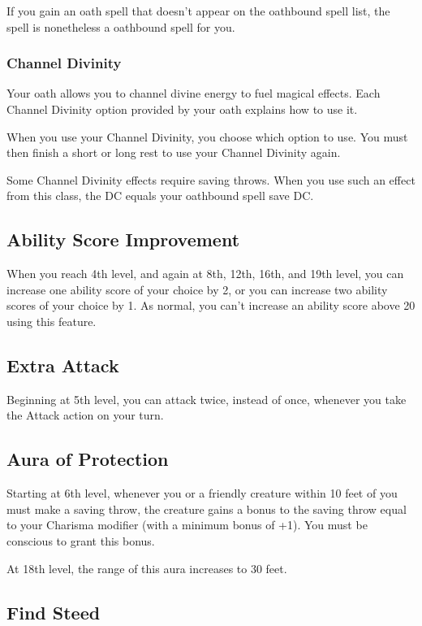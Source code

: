 If you gain an oath spell that doesn't appear on the oathbound spell list, the spell is nonetheless a oathbound spell for you.

\subsubsection{Channel Divinity}

Your oath allows you to channel divine energy to fuel magical effects. Each Channel Divinity option provided by your oath explains how to use it.

When you use your Channel Divinity, you choose which option to use. You must then finish a short or long rest to use your Channel Divinity again.

Some Channel Divinity effects require saving throws. When you use such an effect from this class, the DC equals your oathbound spell save DC.

\subsection{Ability Score Improvement}

When you reach 4th level, and again at 8th, 12th, 16th, and 19th level, you can increase one ability score of your choice by 2, or you can increase two ability scores of your choice by 1. As normal, you can't increase an ability score above 20 using this feature.

\subsection{Extra Attack}

Beginning at 5th level, you can attack twice, instead of once, whenever you take the Attack action on your turn.

\subsection{Aura of Protection}

Starting at 6th level, whenever you or a friendly creature within 10 feet of you must make a saving throw, the creature gains a bonus to the saving throw equal to your Charisma modifier (with a minimum bonus of +1). You must be conscious to grant this bonus.

At 18th level, the range of this aura increases to 30 feet.

\subsection{Find Steed}


